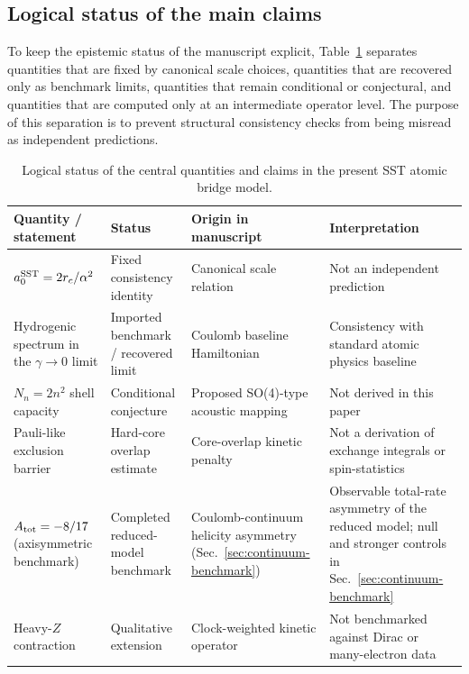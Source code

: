 \documentclass[11pt,a4paper]{article}
\begin{document}
    \subsection{Logical status of the main claims}
    To keep the epistemic status of the manuscript explicit, Table~\ref{tab:status} separates quantities that are fixed by canonical scale choices, quantities that are recovered only as benchmark limits, quantities that remain conditional or conjectural, and quantities that are computed only at an intermediate operator level. The purpose of this separation is to prevent structural consistency checks from being misread as independent predictions.

    \begin{table}[H]
    \centering
    \small
    \begin{tabularx}{\textwidth}{>{\raggedright\arraybackslash}p{} >{\raggedright\arraybackslash}p{} >{\raggedright\arraybackslash}X >{\raggedright\arraybackslash}p{}}
    \toprule
    Quantity / statement & Status & Origin in manuscript & Interpretation \\
    \midrule
    $a_0^{\rm SST}=2r_c/\alpha^2$ & Fixed consistency identity & Canonical scale relation & Not an independent prediction \\
    Hydrogenic spectrum in the $\gamma\to 0$ limit & Imported benchmark / recovered limit & Coulomb baseline Hamiltonian & Consistency with standard atomic physics baseline \\
    $N_n=2n^2$ shell capacity & Conditional conjecture & Proposed SO(4)-type acoustic mapping & Not derived in this paper \\
    Pauli-like exclusion barrier & Hard-core overlap estimate & Core-overlap kinetic penalty & Not a derivation of exchange integrals or spin-statistics \\
    $A_{\rm tot}=-8/17$ (axisymmetric benchmark) & Completed reduced-model benchmark & Coulomb-continuum helicity asymmetry (Sec.~\ref{sec:continuum-benchmark}) & Observable total-rate asymmetry of the reduced model; null and stronger controls in Sec.~\ref{sec:continuum-benchmark} \\
    Heavy-$Z$ contraction & Qualitative extension & Clock-weighted kinetic operator & Not benchmarked against Dirac or many-electron data \\
    \bottomrule
    \end{tabularx}
    \caption{Logical status of the central quantities and claims in the present SST atomic bridge model.}
    \label{tab:status}
    \end{table}
    
\end{document}
